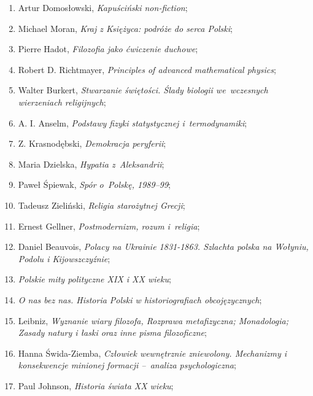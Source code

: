 \documentclass[a4paper,11pt]{article}
\begin{document}
\begin{enumerate}
\item Artur Domosłowski, \emph{Kapuściński non-fiction};

\item Michael Moran, \emph{Kraj z Księżyca: podróże do serca Polski};

\item Pierre Hadot, \emph{Filozofia jako ćwiczenie duchowe};

\item Robert D. Richtmayer, \emph{Principles of advanced mathematical
    physics};

\item Walter Burkert, \emph{Stwarzanie świętości. Ślady biologii
    we~wczesnych wierzeniach religijnych};

\item A. I. Anselm, \emph{Podstawy fizyki statystycznej
    i~termodynamiki};

\item Z. Krasnodębski, \emph{Demokracja peryferii};

\item Maria Dzielska, \emph{Hypatia z~Aleksandrii};

\item Paweł Śpiewak, \emph{Spór o~Polskę, 1989--99};

\item Tadeusz Zieliński, \emph{Religia starożytnej Grecji};

\item Ernest Gellner, \emph{Postmodernizm, rozum i~religia};

\item Daniel Beauvois, \emph{Polacy na Ukrainie 1831-1863. Szlachta
    polska na Wołyniu, Podolu i Kijowszczyźnie};

\item \emph{Polskie mity polityczne XIX i XX wieku};

\item \emph{O nas bez nas. Historia Polski w historiografiach
    obcojęzycznych};

\item Leibniz, \emph{Wyznanie wiary filozofa, Rozprawa metafizyczna;
    Monadologia; Zasady natury i łaski oraz inne pisma filozoficzne};

\item Hanna Świda-Ziemba, \emph{Człowiek wewnętrznie zniewolony.
    Mechanizmy i konsekwencje minionej formacji --~analiza
    psychologiczna};

\item Paul Johnson, \emph{Historia świata XX wieku};


\end{enumerate}
\end{document}
